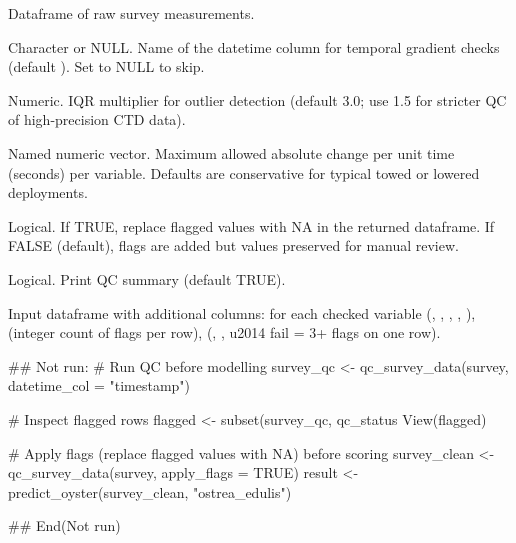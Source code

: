 \documentclass[a4paper]{book}
\begin{document}
%
\begin{Arguments}
\begin{ldescription}
\item[\code{df}] Dataframe of raw survey measurements.

\item[\code{datetime\_col}] Character or NULL. Name of the datetime column for
temporal gradient checks (default ). Set to NULL to skip.

\item[\code{iqr\_k}] Numeric. IQR multiplier for outlier detection (default 3.0;
use 1.5 for stricter QC of high-precision CTD data).

\item[\code{max\_gradients}] Named numeric vector. Maximum allowed absolute change
per unit time (seconds) per variable. Defaults are conservative for typical
towed or lowered deployments.

\item[\code{apply\_flags}] Logical. If TRUE, replace flagged values with NA in the
returned dataframe. If FALSE (default), flags are added but values
preserved for manual review.

\item[\code{verbose}] Logical. Print QC summary (default TRUE).
\end{ldescription}
\end{Arguments}
%
\begin{Value}
Input dataframe with additional columns:
 for each checked variable (, ,
, , ),
 (integer count of flags per row),
 (, ,  \bsl{}u2014 fail = 3+ flags on one row).
\end{Value}
%
\begin{Examples}
\begin{ExampleCode}
## Not run: 
# Run QC before modelling
survey_qc <- qc_survey_data(survey, datetime_col = "timestamp")

# Inspect flagged rows
flagged <- subset(survey_qc, qc_status %
View(flagged)

# Apply flags (replace flagged values with NA) before scoring
survey_clean <- qc_survey_data(survey, apply_flags = TRUE)
result <- predict_oyster(survey_clean, "ostrea_edulis")

## End(Not run)
\end{ExampleCode}
\end{Examples}
\end{document}
